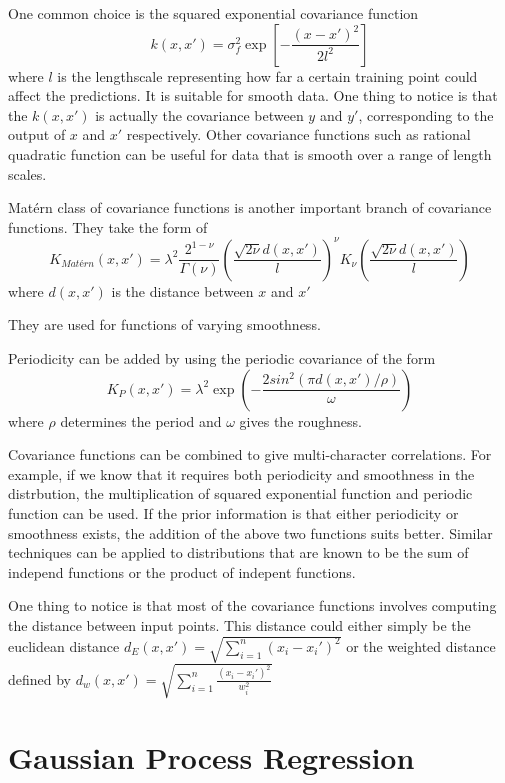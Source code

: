 \documentclass[14pt]{report}
\numberwithin{equation}{chapter}
\begin{document}
\begin{spacing}{2}
One common choice is the squared exponential covariance function
\[k(x,x\prime) = \sigma_f^2\operatorname{exp}\left[-\frac{(x-x\prime)^2}{2l^2}\right]\]
where $l$ is the lengthscale representing how far a certain training point could affect the predictions. It is suitable for smooth data. One thing to notice is that the $k(x,x\prime)$ is actually the covariance between $y$ and $y\prime$, corresponding to the output of $x$ and $x\prime$ respectively. Other covariance functions such as rational quadratic function can be useful for data that is smooth over a range of length scales.

Matérn class of covariance functions is another important branch of covariance functions. They take the form of 
\[K_{Matérn}(x,x\prime) = \lambda^2 \frac{2^{1-\nu}}{\Gamma(\nu)}\left(\frac{\sqrt{2\nu} d(x,x\prime)}{l}\right)^\nu K_\nu \left(\frac{\sqrt{2\nu} d(x,x\prime)}{l}\right)\]
where $d(x,x\prime)$ is the distance between $x$ and $x\prime$

They are used for functions of varying smoothness. 

Periodicity can be added by using the periodic covariance of the form
\[K_P(x,x\prime) = \lambda^2 \operatorname{exp}\left(- \frac{2sin^2\left(\pi d(x,x\prime)/\rho\right)}{\omega}\right)\] 
where $\rho$ determines the period and $\omega$ gives the roughness.

Covariance functions can be combined to give multi-character correlations. For example, if we know that it requires both periodicity and smoothness in the distrbution, the multiplication of squared exponential function and periodic function can be used. If the prior information is that either periodicity or smoothness exists, the addition of the above two functions suits better. Similar techniques can be applied to distributions that are known to be the sum of independ functions or the product of indepent functions.

One thing to notice is that most of the covariance functions involves computing the distance between input points. This distance could either simply be the euclidean distance $d_E(x,x\prime) = \sqrt{\sum\limits_{i=1}^n(x_i - x_i\prime)^2}$ or the weighted distance defined by $d_w(x,x\prime) = \sqrt{\sum\limits_{i=1}^n\frac{(x_i - x_i\prime)^2}{w_i^2}}$


\section{Gaussian Process Regression}


\end{spacing}
\end{document}
